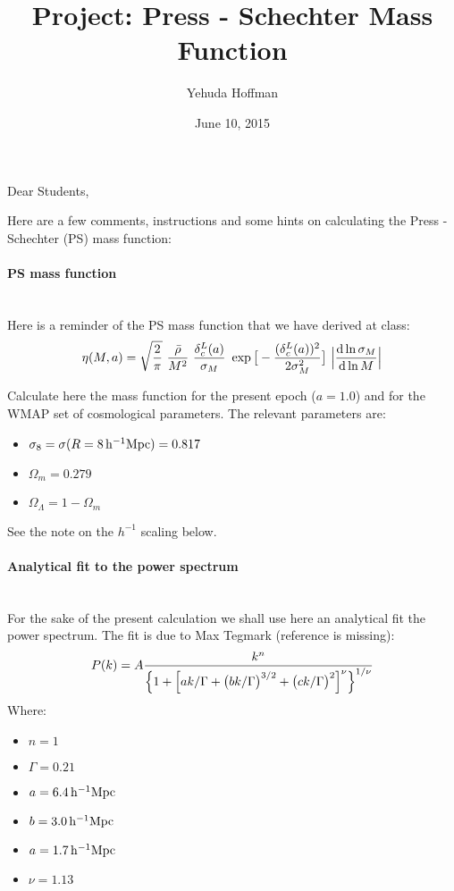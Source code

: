 \documentclass[11pt]{amsart}
\title{Project: Press - Schechter Mass Function}
\author{Yehuda Hoffman}
\date{June 10, 2015} %
\def \d {{\rm d}}
\newcommand{\hmpc}{{\,\rm h^{-1}Mpc}}
\begin{document}
\maketitle
%


Dear Students,

Here are a few comments, instructions and some hints on calculating the Press - Schechter (PS) mass function:

\paragraph{\bf PS mass function } \hspace{10pt} \\
Here is a reminder of the PS mass function that we have derived at class:
\begin{equation}
\label{eq:eta}
\eta(M,a)=\sqrt{2\over\pi}\  {\bar{\rho}\over M^2} \ {\delta{^L_c}(a)\over\sigma_M}\  \exp\big[- {(\delta{^L_c}(a))^2\over2\sigma{^2_M}}\big] 
\  \Big\vert {\d \ln \sigma_M \over\d \ln M } \Big\vert
\end{equation}

Calculate here the mass function for the present epoch ($a=1.0$) and for the WMAP set of cosmological parameters. The relevant parameters are:\begin{itemize}
  \item $\sigma_8= \sigma(R=8\hmpc)= 0.817$
  \item $\Omega_m = 0.279$
  \item $\Omega_\Lambda = 1 - \Omega_m$
\end{itemize}

See the note on the $h^{-1}$ scaling below.

\paragraph{\bf Analytical fit to the power spectrum } \hspace{10pt} \\
For the sake of the present calculation we shall use here an analytical fit the power spectrum. The fit is due to Max Tegmark (reference is missing):
\begin{equation}
\label{eq:Pk}
P(k) = A {k^n \over \Big\{ 1 + \Big[a k / \Gamma+ \big(b k / \Gamma \big)^{3/2} +  \big(c k / \Gamma \big)^2  \Big]^\nu\Big\}^{1 / \nu}}
\end{equation}
Where:
\begin{itemize}
  \item $n=1$
  \item $\Gamma = 0.21$
  \item $a = 6.4 \hmpc$
  \item $b = 3.0 \hmpc$
  \item $a = 1.7 \hmpc$
  \item $\nu = 1.13$
\end{itemize}
\end{document}
